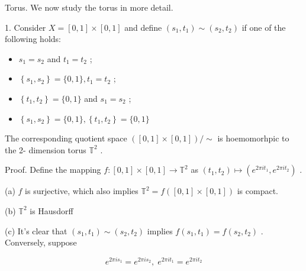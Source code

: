 Torus. We now study the torus in more detail.

1. Consider \(X = \left\lbrack  {0,1}\right\rbrack   \times  \left\lbrack  {0,1}\right\rbrack\) and define \(\left( {{s}_{1},{t}_{1}}\right)  \sim  \left( {{s}_{2},{t}_{2}}\right)\) if one of the following holds:

\begin{itemize}
\item \({s}_{1} = {s}_{2}\) and \({t}_{1} = {t}_{2}\) ;
\end{itemize}

\begin{itemize}
\item \(\left\{  {{s}_{1},{s}_{2}}\right\}   = \{ 0,1\} ,{t}_{1} = {t}_{2}\) ;
\end{itemize}

\begin{itemize}
\item \(\left\{  {{t}_{1},{t}_{2}}\right\}   = \{ 0,1\}\) and \({s}_{1} = {s}_{2}\) ;
\end{itemize}

\begin{itemize}
\item \(\left\{  {{s}_{1},{s}_{2}}\right\}   = \{ 0,1\} ,\left\{  {{t}_{1},{t}_{2}}\right\}   = \{ 0,1\}\)
\end{itemize}

The corresponding quotient space \(\left( {\left\lbrack  {0,1}\right\rbrack   \times  \left\lbrack  {0,1}\right\rbrack  }\right) / \sim\) is hoemomorhpic to the 2- dimension torus \({\mathbb{T}}^{2}\) .

Proof. Define the mapping \(f : \left\lbrack  {0,1}\right\rbrack   \times  \left\lbrack  {0,1}\right\rbrack   \rightarrow  {\mathbb{T}}^{2}\) as \(\left( {{t}_{1},{t}_{2}}\right)  \mapsto  \left( {{e}^{{2\pi i}{t}_{1}},{e}^{{2\pi i}{t}_{2}}}\right)\) .

(a) \(f\) is surjective, which also implies \({\mathbb{T}}^{2} = f\left( {\left\lbrack  {0,1}\right\rbrack   \times  \left\lbrack  {0,1}\right\rbrack  }\right)\) is compact.

(b) \({\mathbb{T}}^{2}\) is Hausdorff

(c) It’s clear that \(\left( {{s}_{1},{t}_{1}}\right)  \sim  \left( {{s}_{2},{t}_{2}}\right)\) implies \(f\left( {{s}_{1},{t}_{1}}\right)  = f\left( {{s}_{2},{t}_{2}}\right)\) . Conversely, suppose

\[
{e}^{{2\pi i}{s}_{1}} = {e}^{{2\pi i}{s}_{2}},\;{e}^{{2\pi i}{t}_{1}} = {e}^{{2\pi i}{t}_{2}}
\]


